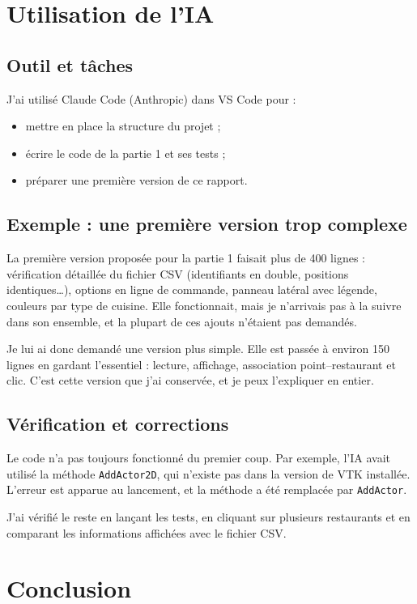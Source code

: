 \documentclass[11pt,a4paper]{article}
\begin{document}

\section{Utilisation de l'IA}

\subsection*{Outil et tâches}

J'ai utilisé Claude Code (Anthropic) dans VS Code pour :
\begin{itemize}
  \item mettre en place la structure du projet ;
  \item écrire le code de la partie 1 et ses tests ;
  \item préparer une première version de ce rapport.
\end{itemize}

\subsection*{Exemple : une première version trop complexe}

La première version proposée pour la partie 1 faisait plus de 400 lignes :
vérification détaillée du fichier CSV (identifiants en double, positions
identiques\dots), options en ligne de commande, panneau latéral avec
légende, couleurs par type de cuisine. Elle fonctionnait, mais je n'arrivais
pas à la suivre dans son ensemble, et la plupart de ces ajouts n'étaient pas
demandés.

Je lui ai donc demandé une version plus simple. Elle est passée à environ
150 lignes en gardant l'essentiel : lecture, affichage, association
point--restaurant et clic. C'est cette version que j'ai conservée, et je peux
l'expliquer en entier.

\subsection*{Vérification et corrections}

Le code n'a pas toujours fonctionné du premier coup. Par exemple, l'IA avait
utilisé la méthode \texttt{AddActor2D}, qui n'existe pas dans la version de
VTK installée. L'erreur est apparue au lancement, et la méthode a été
remplacée par \texttt{AddActor}.

J'ai vérifié le reste en lançant les tests, en cliquant sur plusieurs
restaurants et en comparant les informations affichées avec le fichier CSV.

\section{Conclusion}

\end{document}
